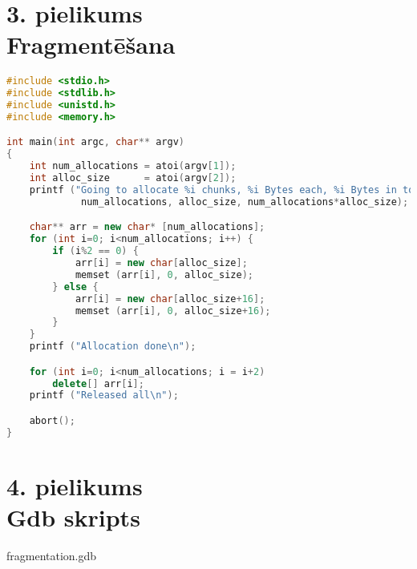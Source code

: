 \newpage
\chapter[3. pielikums. Fragmentēšana] {3. pielikums \\  Fragmentēšana}


\begin{lstlisting}[language=C++]
#include <stdio.h>
#include <stdlib.h>
#include <unistd.h>
#include <memory.h>

int main(int argc, char** argv)
{
	int num_allocations = atoi(argv[1]);
	int alloc_size      = atoi(argv[2]);
	printf ("Going to allocate %i chunks, %i Bytes each, %i Bytes in total\n",
	         num_allocations, alloc_size, num_allocations*alloc_size);

	char** arr = new char* [num_allocations];
	for (int i=0; i<num_allocations; i++) {
		if (i%2 == 0) {
			arr[i] = new char[alloc_size];
			memset (arr[i], 0, alloc_size);
		} else {
			arr[i] = new char[alloc_size+16];
			memset (arr[i], 0, alloc_size+16);
		}
	}
	printf ("Allocation done\n");

	for (int i=0; i<num_allocations; i = i+2)
		delete[] arr[i];
	printf ("Released all\n");

	abort();
} 
\end{lstlisting}


\newpage
\chapter[4. pielikums. Gdb skripts] {4. pielikums \\  Gdb skripts}
{fragmentation.gdb}

